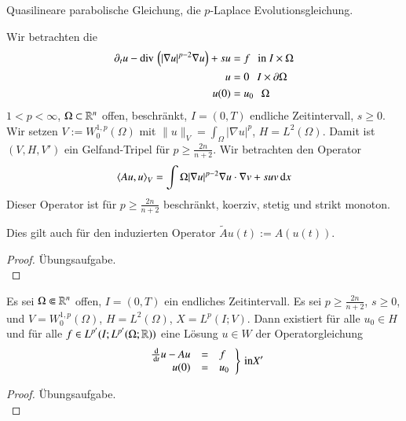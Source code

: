 \begin{beispiel} Quasilineare parabolische Gleichung, die $p$-Laplace Evolutionsgleichung.
\end{beispiel}
Wir betrachten die
\begin{align*}
    \partial_tu-\mathrm{div}\,\left( |\nabla u|^{p-2}\nabla u\right) + su &= f \hspace{.25cm} \text{in } I\times\Omega\\
    u&=0 \hspace{.25cm} I\times \partial \Omega\\
    u(0)&= u_0\hspace{.25cm} \Omega
\end{align*}
$1<p<\infty$, $\Omega \subset\mathbb{R}^n$ offen, beschränkt, $I=(0,T)$ endliche Zeitintervall, $s\geq 0$. Wir
setzen $V:= W_0^{1,p}(\Omega)$ mit $\|u\|_V=\int_\Omega |\nabla u|^p$, $H=L^2(\Omega)$. Damit ist
$(V,H,V')$ ein Gelfand-Tripel für $p\geq \frac{2n}{n+2}$. Wir betrachten den Operator
\begin{align}\label{39}
    \left\langle Au,u\right\rangle _V= \int\Omega |\nabla u|^{p-2}\nabla u \cdot \nabla v + su v \, \mathrm{d} x
\end{align}
Dieser Operator ist für $p\geq \frac{2n}{n+2}$ beschränkt, koerziv, stetig und strikt monoton.
\begin{lem}\label{4.41}
Dies gilt auch für den induzierten Operator $\tilde Au(t):=A(u(t))$.
\end{lem}

\begin{proof}
Übungsaufgabe.\[ \]
\end{proof}

\begin{theorem}\label{4.42}
    Es sei $\Omega \Subset \mathbb{R}^n$ offen, $I=(0,T)$ ein endliches Zeitintervall. Es sei
    $p\geq \frac{2n}{n+2}$, $s\geq 0$, und $V=W_0^{1,p}(\Omega)$, $H=L^2(\Omega)$, $X=L^p(I;V)$.
    Dann existiert für alle $u_0\in H$ und für alle $f\in L^{p'}(I;L^{p'}(\Omega;\mathbb{R}))$ eine Lösung
    $u\in W$ der Operatorgleichung
    \begin{align*}
        \left.\begin{array}{rcl} \frac{\, \mathrm{d}}{\, \mathrm{d} t} u -Au & = & f\\u(0)&=&u_0 \end{array}\right\} \, 
        \text{in} X'
    \end{align*}
\end{theorem}

\begin{proof}
Übungsaufgabe.\[ \]
\end{proof}


